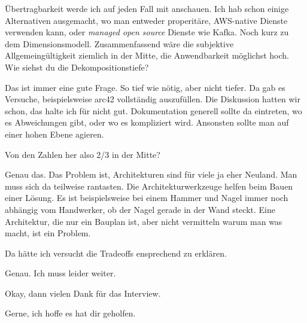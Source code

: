 \LF Übertragbarkeit werde ich auf jeden Fall mit anschauen. Ich hab schon einige Alternativen ausgemacht, wo man entweder properitäre, \ac{AWS}-native Dienste verwenden kann, oder \textit{managed open source} Dienste wie Kafka. Noch kurz zu dem Dimensionsmodell. Zusammenfassend wäre die subjektive Allgemeingültigkeit ziemlich in der Mitte, die Anwendbarkeit möglichst hoch. Wie siehst du die Dekompositionstiefe?

\RB Das ist immer eine gute Frage. So tief wie nötig, aber nicht tiefer. Da gab es Versuche, beispielsweise arc42 vollständig auszufüllen. Die Diskussion hatten wir schon, das halte ich für nicht gut. Dokumentation generell sollte da eintreten, wo es Abweichungen gibt, oder wo es kompliziert wird. Ansonsten sollte man auf einer hohen Ebene agieren.

\LF Von den Zahlen her also 2/3 in der Mitte?

\RB Genau das. Das Problem ist, Architekturen sind für viele ja eher Neuland. Man muss sich da teilweise rantasten. Die Architekturwerkzeuge helfen beim Bauen einer Lösung. Es ist beispielsweise bei einem Hammer und Nagel immer noch abhängig vom Handwerker, ob der Nagel gerade in der Wand steckt. Eine Architektur, die nur ein Bauplan ist, aber nicht vermitteln warum man was macht, ist ein Problem.

\LF Da hätte ich versucht die Tradeoffs ensprechend zu erklären.

\RB Genau. Ich muss leider weiter.

\LF Okay, dann vielen Dank für das Interview.

\RB Gerne, ich hoffe es hat dir geholfen.
